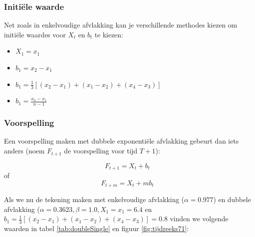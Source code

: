 \subsubsection{Initiële waarde}

Net zoals in enkelvoudige afvlakking kan je verschillende methodes kiezen om initiële waardes voor $X_{t}$ en $b_{t}$ te kiezen:

\begin{itemize}
	\item $X_{1} = x_{1}$
	\item $b_{1} = x_{2} - x_{1}$
	\item $b_{1} = \frac{1}{3}\left[ (x_{2} - x_{1}) + (x_{1} - x_{2}) + (x_{4} - x_{3}) \right]$
	\item $b_{1} = \frac{x_{n} - x_{1}}{n-1}$
\end{itemize}

\subsubsection{Voorspelling}

Een voorspelling maken met dubbele exponentiële afvlakking gebeurt dan iets anders (noem $F_{t+1}$ de voorspelling voor tijd $T+1$):

\[ F_{t+1} = X_{t} + b_{t} \]
of
\[ F_{t+m} = X_{t} + m b_{t} \]

Als we nu de tekening maken met enkelvoudige afvlakking ($\alpha = 0.977$) en dubbele afvlakking ($\alpha = 0.3623, \beta = 1.0, X_{1} = x_{1} = 6.4$ en $b_{1} = \frac{1}{3}\left[ (x_{2} - x_{1}) + (x_{1} - x_{2}) + (x_{4} - x_{3}) \right] = 0.8$ vinden we volgende waarden in tabel \ref{tab:doubleSingle} en figuur \ref{fig:tijdreeks71}:

